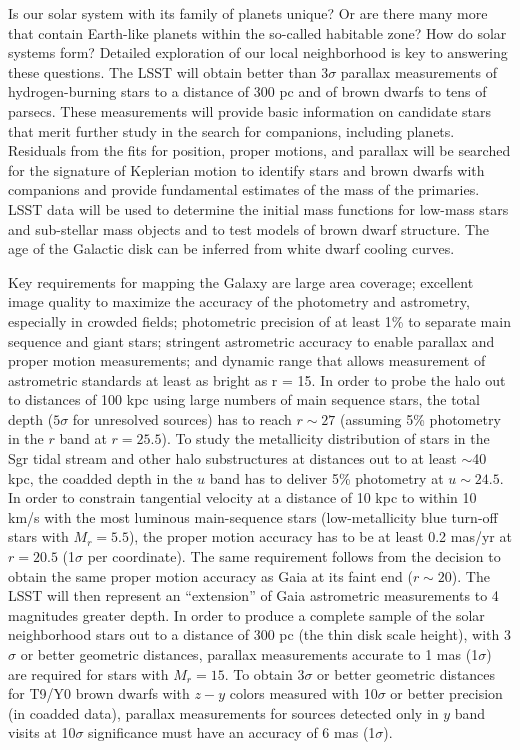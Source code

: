 Is our solar system with its family of planets unique? Or are there many
more that contain Earth-like planets within the so-called habitable zone?
How do solar systems form? Detailed exploration of our local neighborhood
is key to answering these questions.  The LSST will obtain better than
3$\sigma$ parallax measurements of hydrogen-burning stars to a distance of
300 pc and of brown dwarfs to tens of parsecs. These measurements will
provide basic information on candidate stars that merit further study in
the search for companions, including planets.  Residuals from the fits for
position, proper motions, and parallax will be searched for the signature
of Keplerian motion to identify stars and brown dwarfs with companions and
provide fundamental estimates of the mass of the primaries. LSST data will
be used to determine the initial mass functions for low-mass stars and
sub-stellar mass objects and to test models of brown dwarf structure. The
age of the Galactic disk can be inferred from white dwarf cooling curves.

Key requirements for mapping the Galaxy are large area coverage; excellent
image quality to maximize the accuracy of the photometry and astrometry,
especially in crowded fields; photometric precision of at least 1\% to
separate main sequence and giant stars; stringent astrometric accuracy to
enable parallax and proper motion measurements; and dynamic range that
allows measurement of astrometric standards at least as bright as r =
15. In order to probe the halo out to distances of 100 kpc using large numbers of
main sequence stars, the total depth ($5\sigma$ for unresolved sources)
has to reach $r\sim27$ (assuming 5\% photometry in the $r$ band at $r=25.5$).
To study the metallicity distribution of stars in the Sgr tidal stream and other halo
substructures at distances out to at least $\sim$40 kpc, the coadded depth in
the $u$ band has to deliver 5\% photometry at $u\sim24.5$.
In order to constrain tangential velocity at a distance of 10 kpc to within 10 km/s
with the most luminous main-sequence stars (low-metallicity blue turn-off stars with $M_r=5.5$),
the proper motion accuracy has to be at least 0.2 mas/yr at $r=20.5$ (1$\sigma$ per coordinate).
The same requirement follows from the decision to obtain the same proper motion accuracy
as Gaia at its faint end ($r\sim20$). The LSST will then represent an ``extension'' of Gaia
astrometric measurements to 4 magnitudes greater depth. In order to produce
a complete sample of the solar neighborhood stars out to a distance of 300
pc (the thin disk scale height), with 3$\sigma$ or better geometric
distances, parallax measurements accurate to 1 mas (1$\sigma$) are required
for stars with $M_r=15$.
To obtain 3$\sigma$ or better geometric distances for T9/Y0 brown dwarfs with
$z-y$ colors measured with 10$\sigma$ or better precision (in coadded data),
parallax  measurements for sources detected only in $y$ band visits at 10$\sigma$
significance must have an accuracy of 6 mas (1$\sigma$).

